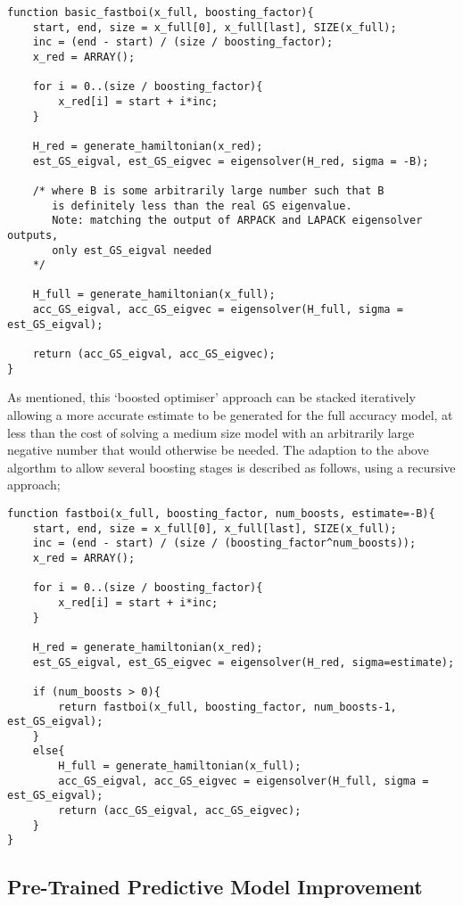 \begin{lstlisting}
function basic_fastboi(x_full, boosting_factor){
	start, end, size = x_full[0], x_full[last], SIZE(x_full);
	inc = (end - start) / (size / boosting_factor);
	x_red = ARRAY();

	for i = 0..(size / boosting_factor){
		x_red[i] = start + i*inc;
	}

	H_red = generate_hamiltonian(x_red); 
	est_GS_eigval, est_GS_eigvec = eigensolver(H_red, sigma = -B);
	
	/* where B is some arbitrarily large number such that B
	   is definitely less than the real GS eigenvalue.
	   Note: matching the output of ARPACK and LAPACK eigensolver outputs,
	   only est_GS_eigval needed
	*/ 
	
	H_full = generate_hamiltonian(x_full);
	acc_GS_eigval, acc_GS_eigvec = eigensolver(H_full, sigma = est_GS_eigval);
	
	return (acc_GS_eigval, acc_GS_eigvec);
}
\end{lstlisting}

As mentioned, this `boosted optimiser' approach can be stacked iteratively allowing a more accurate estimate to be generated for the full accuracy model, at less than the cost of solving a medium size model with an arbitrarily large negative number that would otherwise be needed. The adaption to the above algorthm to allow several boosting stages is described as follows, using a recursive approach;

\begin{lstlisting}
function fastboi(x_full, boosting_factor, num_boosts, estimate=-B){
	start, end, size = x_full[0], x_full[last], SIZE(x_full);
	inc = (end - start) / (size / (boosting_factor^num_boosts));
	x_red = ARRAY();

	for i = 0..(size / boosting_factor){
		x_red[i] = start + i*inc;
	}

	H_red = generate_hamiltonian(x_red); 
	est_GS_eigval, est_GS_eigvec = eigensolver(H_red, sigma=estimate);
	
	if (num_boosts > 0){
		return fastboi(x_full, boosting_factor, num_boosts-1, est_GS_eigval);
	}
	else{
		H_full = generate_hamiltonian(x_full);
		acc_GS_eigval, acc_GS_eigvec = eigensolver(H_full, sigma = est_GS_eigval);
		return (acc_GS_eigval, acc_GS_eigvec);
	}
}
\end{lstlisting}

\subsection{Pre-Trained Predictive Model Improvement}


